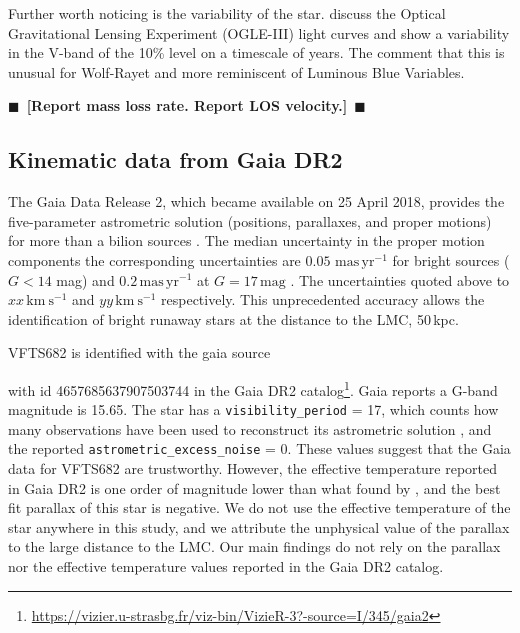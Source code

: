 \documentclass[apjl,twocolumn]{emulateapj}
\newcommand{\todo}[1]{{\large $\blacksquare$~\textbf{\color{red}[#1]}}~$\blacksquare$}
\newcommand{\kms}{{\,\mathrm{km\ s^{-1}}}}
\newcommand{\masyr}{{\,\mathrm{mas}\,\mathrm{yr}^{-1}}}
\begin{document}
{Further worth noticing is the variability of the star.  \citep{Bestenlehner+2011} discuss the Optical Gravitational Lensing Experiment (OGLE-III) light curves \citep{Udalski+2008} and show a variability in the V-band of the 10\% level on a timescale of years.  The comment that this is unusual for Wolf-Rayet and more reminiscent of Luminous Blue Variables. 

\todo{Report mass loss rate.  Report LOS velocity.}


\subsection{Kinematic data from Gaia DR2  \label{data:gaia}}

The Gaia Data Release 2, which became available on 25 April 2018, provides the five-parameter astrometric solution (positions, parallaxes, and proper motions) for more than a bilion sources \citep{Gaia-Collaboration+2018}.  The median uncertainty in the proper motion components the corresponding uncertainties are $0.05\,\masyr$ for bright sources  ($G<14$ mag) and $0.2\masyr$ at $G=17\,\mathrm{mag}$ \citep{Lindegren+2018}.  The uncertainties quoted above to $xx\kms$ and $yy\kms$ respectively.  This unprecedented accuracy allows the identification of bright runaway stars at the distance to the LMC, 50\,kpc. 

VFTS682 is identified with the gaia source} with id 4657685637907503744 in the Gaia DR2
catalog\footnote{\url{https://vizier.u-strasbg.fr/viz-bin/VizieR-3?-source=I/345/gaia2}}. Gaia reports a G-band magnitude is 15.65. The star has a
\texttt{visibility\_period} = 17, which counts how many observations have
been used to reconstruct its astrometric solution
\citep[][]{lindengren:18}, and the reported
\texttt{astrometric\_excess\_noise} = 0. These values suggest that the Gaia
data for VFTS682 are trustworthy. However, the effective temperature
reported in Gaia DR2 is one order of magnitude lower than what found by
\cite{bestenlehner:11}, and the best fit parallax of this star is
negative. We do not use the effective temperature of the star anywhere
in this study, and we attribute the unphysical value of the parallax
to the large distance to the LMC. Our main findings do not rely on the
parallax nor the effective temperature values reported in the Gaia DR2
catalog.

\end{document}
